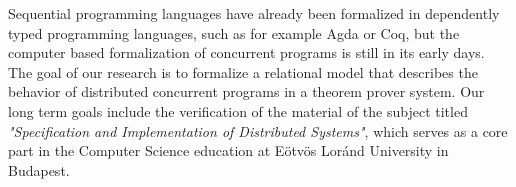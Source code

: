 Sequential programming languages have already been formalized in dependently typed programming languages, such as for example Agda or Coq, but the computer based formalization of concurrent programs is still in its early days. The goal of our research is to formalize a relational model that describes the behavior of distributed concurrent programs in a
theorem prover system. Our long term goals include the verification of the material of the subject titled \textit{"Specification and Implementation of Distributed Systems"}, which serves as a core part in the Computer Science education at Eötvös Loránd University in Budapest.